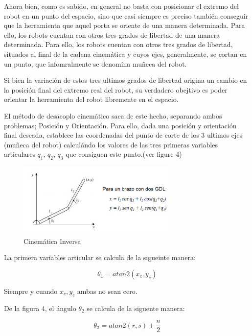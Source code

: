 \documentclass[letter,openright,12pt,spanish]{report}
\begin{document}
Ahora bien, como es sabido, en general no basta con posicionar el extremo del robot en un punto del espacio, sino que casi siempre es preciso tambi\'en conseguir que la herramienta que aquel porta se oriente de una manera determinada. Para ello, los robots cuentan con otros tres grados de libertad de una manera determinada. Para ello, los robots cuentan con otros tres grados de libertad, situados al final de la cadena cinem\'atica y cuyos ejes, generalmente, se cortan en un punto, que infomralmente se denomina mu\~neca del robot.

Si bien la variaci\'on de estos tres ultimos grados de libertad origina un cambio en la posici\'on final del extremo real del robot, su verdadero obejtivo es poder orientar la herramienta del robot libremente en el espacio.

El m\'etodo de desacoplo cinem\'atico saca de este hecho, separando ambos problemas; Posici\'on y Orientaci\'on. Para ello, dada una posici\'on y orientaci\'on final deseada, establece las coordenadas del punto de corte de los 3 ultimos ejes (mu\~neca del robot) calcul\'ando los valores de las tres primeras variables articulares $q_1$, $q_2$, $q_3$ que consiguen este punto.(ver figure 4)\\

\begin{figure}[htp]
\centering
\includegraphics[width=8cm]{4.jpg}
\caption{Cinem\'atica Inversa}
\label{Figura 4}
\end{figure}

La primera variables articular se calcula de la sigueinte manera:

\begin{displaymath}
\theta_1 = atan2(x_c, y_c)
\end{displaymath}

Siempre y cuando $x_c, y_c$ ambas no sean cero.

De la figura 4, el \'angulo $\theta_2$ se calcula de la siguente manera:

\begin{displaymath}
\theta_2 =atan2(r,s)+ \frac{n}{2}
\end{displaymath}
\end{document}
